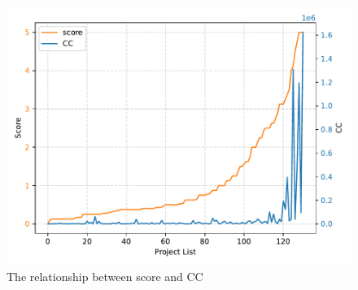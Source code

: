 \documentclass[sigconf,screen,review,anonymous]{acmart}
\begin{document}
\begin{figure}
  \centering
  \includegraphics[width=\linewidth]{figure2.pdf}
  \caption{The relationship between score and CC}
  \label{fig:figure2}
\end{figure}
\end{document}
